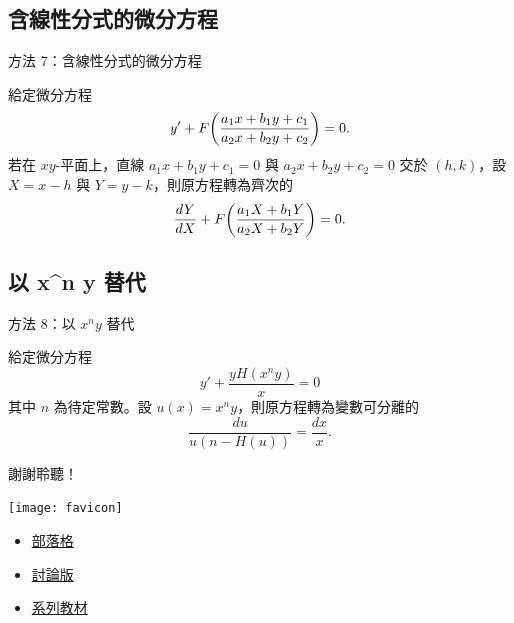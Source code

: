 \documentclass{beamer}
\newcommand{\Left} {\mathopen{}\mathclose\bgroup\left}
\newcommand{\Right}{\aftergroup\egroup\right}
\theoremstyle{remark}
\begin{document}
\begin{CJK}{UTF8}{bsmi}
\subsection[含線性分式]{含線性分式的微分方程}
\begin{frame}{方法 7：含線性分式的微分方程}
  \begin{theorem}
    給定微分方程
    \[y' + F \Left( \frac{a_1 x + b_1 y + c_1}{a_2 x + b_2 y + c_2} \Right) = 0.\]
    若在 $xy$-平面上，直線 $a_1 x + b_1 y + c_1 = 0$ 與 $a_2 x + b_2 y + c_2 = 0$ 交於 $(h,k)$，設 $X = x-h$ 與
    $Y = y-k$，則原方程轉為齊次的
    \[\frac{dY}{dX} + F \Left( \frac{a_1 X + b_1 Y}{a_2 X + b_2 Y} \Right) = 0.\]
  \end{theorem}
\end{frame}

\subsection[以 $x^n y$ 替代]{以 x\textasciicircum n y 替代}
\begin{frame}{方法 8：以 $x^n y$ 替代}
  \begin{theorem}
    給定微分方程
    \[y' + \frac{y H(x^n y)}{x} = 0\]
    其中 $n$ 為待定常數。設 $u(x) = x^n y$，則原方程轉為變數可分離的
    \[\frac{du}{u \left( n - H(u) \right)} = \frac{dx}{x}.\]
  \end{theorem}
\end{frame}

\begin{frame}{謝謝聆聽！}
  \begin{center}
    \texttt{[image: favicon]}
  \end{center}
  \begin{itemize}
    \item \href{http://jdh8.org/}{部落格}
    \item \href{http://boards.jdh8.org/cal/}{討論版}
    \item \href{https://github.com/jdh8/calculus-2012}{系列教材}
  \end{itemize}
\end{frame}
\end{CJK}
\end{document}
